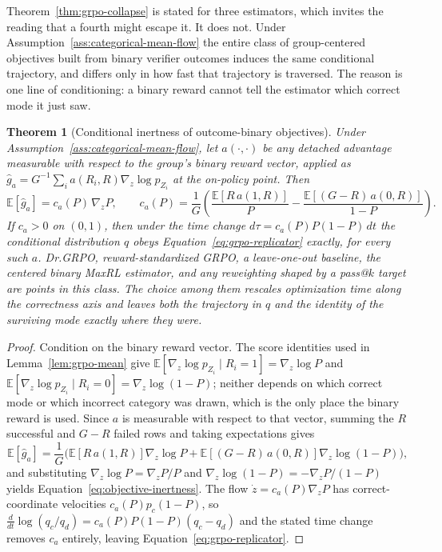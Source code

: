 \documentclass{article}
\newcommand{\1}{\mathbf 1}
\newcommand{\E}{\mathbb E}
\newtheorem{theorem}[lemma]{Theorem}
\theoremstyle{remark}
\theoremstyle{definition}
\theoremstyle{plain}
\begin{document}
Theorem~\ref{thm:grpo-collapse} is stated for three estimators, which invites
the reading that a fourth might escape it. It does not. Under
Assumption~\ref{ass:categorical-mean-flow} the entire class of group-centered
objectives built from binary verifier outcomes induces the same conditional
trajectory, and differs only in how fast that trajectory is traversed. The
reason is one line of conditioning: a binary reward cannot tell the estimator
which correct mode it just saw.

\begin{theorem}[Conditional inertness of outcome-binary objectives]
\label{thm:objective-inertness}
Under Assumption~\ref{ass:categorical-mean-flow}, let $a(\cdot,\cdot)$ be any
detached advantage measurable with respect to the group's binary reward
vector, applied as
$\widehat g_a=G^{-1}\sum_{i}a(R_i,R)\nabla_z\log p_{Z_i}$ at the on-policy
point. Then
\begin{equation}
  \E[\widehat g_a]=c_a(P)\,\nabla_zP,
  \qquad
  c_a(P)=\frac1G\left(
  \frac{\E[R\,a(1,R)]}{P}-\frac{\E[(G-R)\,a(0,R)]}{1-P}\right).
  \label{eq:objective-inertness}
\end{equation}
If $c_a>0$ on $(0,1)$, then under the time change
$d\tau=c_a(P)P(1-P)\,dt$ the conditional distribution $q$ obeys
Equation~\eqref{eq:grpo-replicator} exactly, for every such $a$. Dr.GRPO,
reward-standardized GRPO, a leave-one-out baseline, the centered binary MaxRL
estimator, and any reweighting shaped by a pass@$k$ target are points in this
class. The choice among them rescales optimization time along the correctness
axis and leaves both the trajectory in $q$ and the identity of the surviving
mode exactly where they were.
\end{theorem}

\begin{proof}
Condition on the binary reward vector. The score identities used in
Lemma~\ref{lem:grpo-mean} give
$\E[\nabla_z\log p_{Z_i}\mid R_i=1]=\nabla_z\log P$ and
$\E[\nabla_z\log p_{Z_i}\mid R_i=0]=\nabla_z\log(1-P)$; neither depends on
which correct mode or which incorrect category was drawn, which is the only
place the binary reward is used. Since $a$ is measurable with respect to that
vector, summing the $R$ successful and $G-R$ failed rows and taking
expectations gives
\[
  \E[\widehat g_a]
  =\frac1G\Big(\E[R\,a(1,R)]\nabla_z\log P
   +\E[(G-R)\,a(0,R)]\nabla_z\log(1-P)\Big),
\]
and substituting $\nabla_z\log P=\nabla_zP/P$ and
$\nabla_z\log(1-P)=-\nabla_zP/(1-P)$ yields
Equation~\eqref{eq:objective-inertness}. The flow
$\dot z=c_a(P)\nabla_zP$ has correct-coordinate velocities
$c_a(P)p_c(1-P)$, so $\frac{d}{dt}\log(q_c/q_d)=c_a(P)P(1-P)(q_c-q_d)$ and the
stated time change removes $c_a$ entirely, leaving
Equation~\eqref{eq:grpo-replicator}.
\end{proof}
\end{document}
